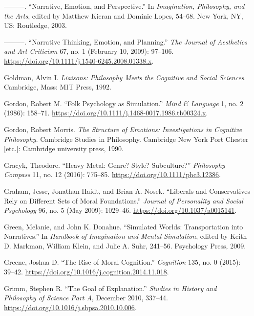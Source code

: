 \documentclass[phdthesis,12pt,final]{wuthesis}
\newlength{\cslhangindent}
\newenvironment{CSLReferences}[2] %
{\begin{list}{}{%
	\setlength{\itemindent}{0pt}
	\setlength{\leftmargin}{0pt}
	\setlength{\parsep}{0pt}
	\ifodd #1
	\setlength{\leftmargin}{\cslhangindent}
	\setlength{\itemindent}{-1\cslhangindent}
	\fi
	\setlength{\itemsep}{#2\baselineskip}}}
{\end{list}}
\theoremstyle{definition}
\theoremstyle{definition}
\theoremstyle{definition}
\theoremstyle{definition}
\theoremstyle{remark}
\begin{document}
\begin{CSLReferences}{1}{0}
---------. {``Narrative, Emotion, and Perspective.''} In \emph{Imagination, {Philosophy}, and the {Arts}}, edited by Matthew Kieran and Dominic Lopes, 54--68. New York, NY, US: Routledge, 2003.

---------. {``Narrative {Thinking}, {Emotion}, and {Planning}.''} \emph{The Journal of Aesthetics and Art Criticism} 67, no. 1 (February 10, 2009): 97--106. \url{https://doi.org/10.1111/j.1540-6245.2008.01338.x}.

Goldman, Alvin I. \emph{Liaisons: Philosophy Meets the Cognitive and Social Sciences}. Cambridge, Mass: MIT Press, 1992.

Gordon, Robert M. {``Folk Psychology as Simulation.''} \emph{Mind \& Language} 1, no. 2 (1986): 158--71. \url{https://doi.org/10.1111/j.1468-0017.1986.tb00324.x}.

Gordon, Robert Morris. \emph{The Structure of Emotions: Investigations in Cognitive Philosophy}. Cambridge Studies in Philosophy. Cambridge New York Port Chester {[}etc.{]}: Cambridge university press, 1990.

Gracyk, Theodore. {``Heavy Metal: Genre? {Style}? {Subculture}?''} \emph{Philosophy Compass} 11, no. 12 (2016): 775--85. \url{https://doi.org/10.1111/phc3.12386}.

Graham, Jesse, Jonathan Haidt, and Brian A. Nosek. {``Liberals and Conservatives Rely on Different Sets of Moral Foundations.''} \emph{Journal of Personality and Social Psychology} 96, no. 5 (May 2009): 1029--46. \url{https://doi.org/10.1037/a0015141}.

Green, Melanie, and John K. Donahue. {``Simulated {Worlds}: {Transportation} into {Narratives}.''} In \emph{Handbook of {Imagination} and {Mental Simulation}}, edited by Keith D. Markman, William Klein, and Julie A. Suhr, 241--56. Psychology Press, 2009.

Greene, Joshua D. {``The Rise of Moral Cognition.''} \emph{Cognition} 135, no. 0 (2015): 39--42. \url{https://doi.org/10.1016/j.cognition.2014.11.018}.

Grimm, Stephen R. {``The Goal of Explanation.''} \emph{Studies in History and Philosophy of Science Part A}, December 2010, 337--44. \url{https://doi.org/10.1016/j.shpsa.2010.10.006}.


\end{CSLReferences}
\end{document}
